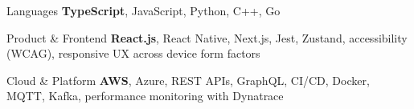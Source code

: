 
\begin{cvskills}

  \cvskill
  {Languages}
  {\textbf{TypeScript}, JavaScript, Python, C++, Go}

  \cvskill
  {Product \& Frontend}
  {\textbf{React.js}, React Native, Next.js, Jest, Zustand, accessibility (WCAG), responsive UX across device form factors}

  \cvskill
  {Cloud \& Platform}
  {\textbf{AWS}, Azure, REST APIs, GraphQL, CI/CD, Docker,  MQTT, Kafka, performance monitoring with Dynatrace}

\end{cvskills}
